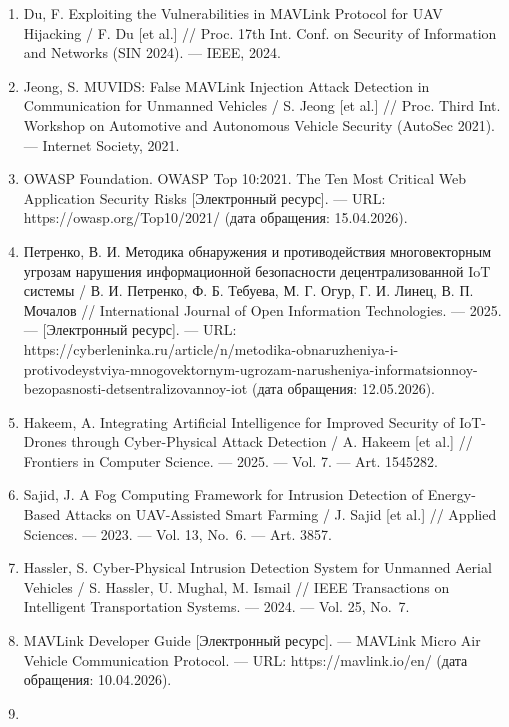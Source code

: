 \documentclass[14pt,a4paper]{extarticle}
\begin{document}
\begin{enumerate}
  Петренко, В. И. Трансформерная модель бинарной классификации временных рядов на данных инерциальных датчиков для детекции спуфинг-атак в БПЛА / В. И. Петренко {[}и др.{]} // International Journal of Open Information Technologies. --- 2026. --- Т. 14, № 2. --- С. 11--18.
\item
  Du, F. Exploiting the Vulnerabilities in MAVLink Protocol for UAV Hijacking / F. Du {[}et al.{]} // Proc. 17th Int. Conf. on Security of Information and Networks (SIN 2024). --- IEEE, 2024.
\item
  Jeong, S. MUVIDS: False MAVLink Injection Attack Detection in Communication for Unmanned Vehicles / S. Jeong {[}et al.{]} // Proc. Third Int. Workshop on Automotive and Autonomous Vehicle Security (AutoSec 2021). --- Internet Society, 2021.
\item
  OWASP Foundation. OWASP Top 10:2021. The Ten Most Critical Web Application Security Risks {[}Электронный ресурс{]}. --- URL: https://owasp.org/Top10/2021/ (дата обращения: 15.04.2026).
\item
  Петренко, В. И. Методика обнаружения и противодействия многовекторным угрозам нарушения информационной безопасности децентрализованной IoT системы / В. И. Петренко, Ф. Б. Тебуева, М. Г. Огур, Г. И. Линец, В. П. Мочалов // International Journal of Open Information Technologies. --- 2025. --- {[}Электронный ресурс{]}. --- URL: https://cyberleninka.ru/article/n/metodika-obnaruzheniya-i-protivodeystviya-mnogovektornym-ugrozam-narusheniya-informatsionnoy-bezopasnosti-detsentralizovannoy-iot (дата обращения: 12.05.2026).
\item
  Hakeem, A. Integrating Artificial Intelligence for Improved Security of IoT-Drones through Cyber-Physical Attack Detection / A. Hakeem {[}et al.{]} // Frontiers in Computer Science. --- 2025. --- Vol. 7. --- Art. 1545282.
\item
  Sajid, J. A Fog Computing Framework for Intrusion Detection of Energy-Based Attacks on UAV-Assisted Smart Farming / J. Sajid {[}et al.{]} // Applied Sciences. --- 2023. --- Vol. 13, No.~6. --- Art. 3857.
\item
  Hassler, S. Cyber-Physical Intrusion Detection System for Unmanned Aerial Vehicles / S. Hassler, U. Mughal, M. Ismail // IEEE Transactions on Intelligent Transportation Systems. --- 2024. --- Vol. 25, No.~7.
\item
  MAVLink Developer Guide {[}Электронный ресурс{]}. --- MAVLink Micro Air Vehicle Communication Protocol. --- URL: https://mavlink.io/en/ (дата обращения: 10.04.2026).
\item

\end{enumerate}
\end{document}
